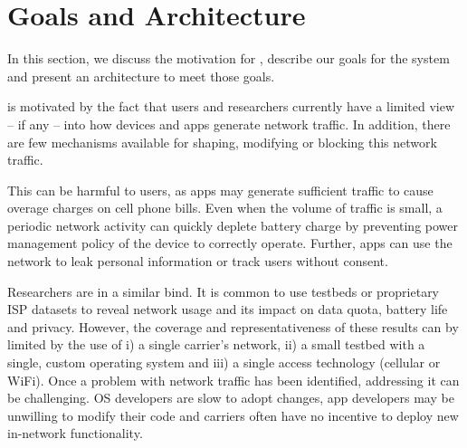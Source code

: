 \section{Goals and Architecture}
In this section, we discuss the motivation for \meddle, describe our goals for the 
system and present an architecture to meet those goals.

\meddle is motivated by the fact that users and researchers currently 
have a limited view -- if any -- into how devices and apps generate network 
traffic. In addition, there are few mechanisms available for shaping, modifying 
or blocking this network traffic. 

This can be harmful to users, as apps may generate sufficient traffic
to cause overage charges on cell phone bills. Even when the volume of
traffic is small, a periodic network activity can quickly deplete
battery charge by preventing power management policy of the device to
correctly operate. Further, apps can use the network to leak personal
information or track users without consent.

Researchers  are in a similar bind. It is common 
to use testbeds or proprietary ISP datasets to reveal network usage 
and its impact on data quota, battery life and privacy. However, the 
coverage and representativeness of these results can by limited by 
the use of i) a single carrier's network, ii) a small testbed with 
a single, custom operating system and iii) a single access technology 
(cellular or WiFi). Once a problem with network traffic has been identified, 
addressing it can be challenging. OS developers are slow to 
adopt changes, app developers may be unwilling to modify their code 
and carriers often have no incentive to deploy new in-network 
functionality. 


